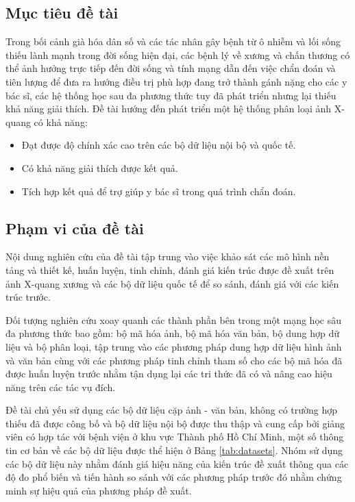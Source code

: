   \subsection{Mục tiêu đề tài}

  Trong bối cảnh già hóa dân số và các tác nhân gây bệnh từ ô nhiễm và lối sống thiếu lành mạnh trong đời sống hiện đại, các bệnh lý về xương và chấn thương có thể ảnh hưởng trực tiếp đến đời sống và tính mạng dẫn đến việc chẩn đoán và tiên lượng để đưa ra hướng điều trị phù hợp đang trở thành gánh nặng cho các y bác sĩ, các hệ thống học sau đa phương thức tuy đã phát triển nhưng lại thiếu khả năng giải thích. Đề tài hướng đến phát triển một hệ thống phân loại ảnh X-quang có khả năng:
  \begin{itemize}
      \item Đạt được độ chính xác cao trên các bộ dữ liệu nội bộ và quốc tế.
      \item Có khả năng giải thích được kết quả.
      \item Tích hợp kết quả để trợ giúp y bác sĩ trong quá trình chẩn đoán.
  \end{itemize}
  
  \subsection{Phạm vi của đề tài}

  Nội dung nghiên cứu của đề tài tập trung vào việc khảo sát các mô hình nền tảng và thiết kế, huấn luyện, tinh chỉnh, đánh giá kiến trúc được đề xuất trên ảnh X-quang xương và các bộ dữ liệu quốc tế để so sánh, đánh giá với các kiến trúc trước.

  Đối tượng nghiên cứu xoay quanh các thành phần bên trong một mạng học sâu đa phương thức bao gồm: bộ mã hóa ảnh, bộ mã hóa văn bản, bộ dung hợp dữ liệu và bộ phân loại, tập trung vào các phương pháp dung hợp dữ liệu hình ảnh và văn bản cùng với các phương pháp tinh chỉnh tham số cho các bộ mã hóa đã được huấn luyện trước nhằm tận dụng lại các tri thức đã có và nâng cao hiệu năng trên các tác vụ đích.

  Đề tài chủ yếu sử dụng các bộ dữ liệu cặp ảnh - văn bản, không có trường hợp thiếu đã được công bố và bộ dữ liệu nội bộ được thu thập và cung cấp bởi giảng viên có hợp tác với bệnh viện ở khu vực Thành phố Hồ Chí Minh, một số thông tin cơ bản về các bộ dữ liệu được thể hiện ở Bảng \ref{tab:datasets}. Nhóm sử dụng các bộ dữ liệu này nhằm đánh giá hiệu năng của kiến trúc đề xuất thông qua các độ đo phổ biến và tiến hành so sánh với các phương pháp trước đó nhằm chứng minh sự hiệu quả của phương pháp đề xuất.

